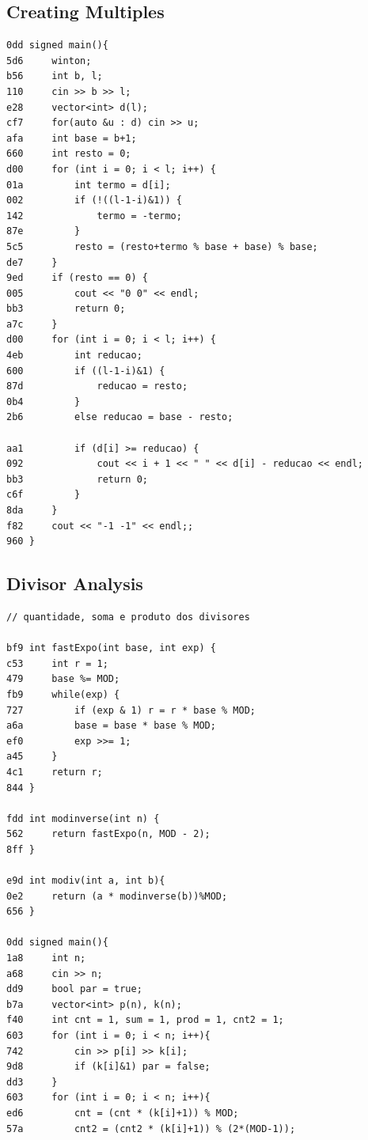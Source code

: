 \documentclass[11pt, a4paper, twoside]{article}
\begin{document}
{{\subsection{Creating Multiples}
\begin{lstlisting}
0dd signed main(){
5d6     winton;
b56     int b, l;
110     cin >> b >> l;
e28     vector<int> d(l);
cf7     for(auto &u : d) cin >> u;
afa     int base = b+1;
660     int resto = 0;
d00     for (int i = 0; i < l; i++) {
01a         int termo = d[i];
002         if (!((l-1-i)&1)) {
142             termo = -termo;
87e         }
5c5         resto = (resto+termo % base + base) % base;
de7     }
9ed     if (resto == 0) {
005         cout << "0 0" << endl;
bb3         return 0;
a7c     }
d00     for (int i = 0; i < l; i++) {
4eb         int reducao;
600         if ((l-1-i)&1) {
87d             reducao = resto;
0b4         } 
2b6         else reducao = base - resto;
     
aa1         if (d[i] >= reducao) {
092             cout << i + 1 << " " << d[i] - reducao << endl;
bb3             return 0;
c6f         }
8da     }
f82     cout << "-1 -1" << endl;;
960 }
\end{lstlisting}

\subsection{Divisor Analysis}
\begin{lstlisting}
// quantidade, soma e produto dos divisores

bf9 int fastExpo(int base, int exp) {
c53     int r = 1;
479     base %= MOD;
fb9     while(exp) {
727         if (exp & 1) r = r * base % MOD;
a6a         base = base * base % MOD;
ef0         exp >>= 1;
a45     }
4c1     return r;
844 }

fdd int modinverse(int n) {
562     return fastExpo(n, MOD - 2);
8ff }

e9d int modiv(int a, int b){
0e2     return (a * modinverse(b))%MOD;
656 }

0dd signed main(){
1a8     int n;
a68     cin >> n;
dd9     bool par = true;
b7a     vector<int> p(n), k(n);
f40     int cnt = 1, sum = 1, prod = 1, cnt2 = 1;
603     for (int i = 0; i < n; i++){
742         cin >> p[i] >> k[i];
9d8         if (k[i]&1) par = false;
dd3     }
603     for (int i = 0; i < n; i++){          
ed6         cnt = (cnt * (k[i]+1)) % MOD;
57a         cnt2 = (cnt2 * (k[i]+1)) % (2*(MOD-1));
            

\end{lstlisting}}}
\end{document}
